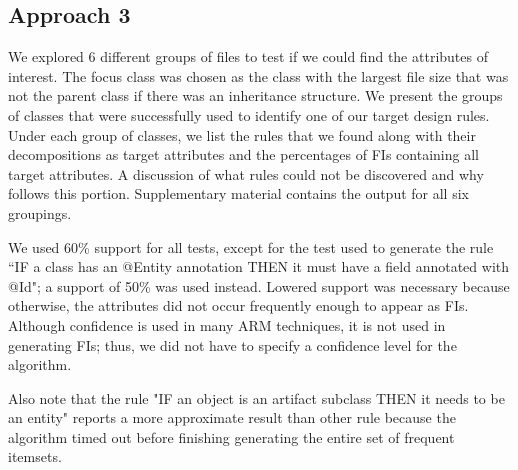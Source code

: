 \documentclass[12pt]{article}
\begin{document}
	\subsection{Approach 3}
	
	We explored 6 different groups of files to test if we could find the attributes of interest. The focus class was chosen as the class with the largest file size that was not the parent class if there was an inheritance structure. We present the groups of classes that were successfully used to identify one of our target design rules. Under each group of classes, we list the rules that we found along with their decompositions as target attributes and the percentages of FIs containing all target attributes. A discussion of what rules could not be discovered and why follows this portion. Supplementary material contains the output for all six groupings. 
	
	
	We used 60\% support for all tests, except for the test used to generate the rule ``IF a class has an @Entity annotation THEN it must have a field annotated with @Id"; a support of 50\% was used instead. Lowered support was necessary because otherwise, the attributes did not occur frequently enough to appear as FIs. Although confidence is used in many ARM techniques, it is not used in generating FIs; thus, we did not have to specify a confidence level for the algorithm. 
	
	Also note that the rule "IF an object is an artifact subclass THEN it needs to be an entity" reports a more approximate result than other rule because the algorithm timed out before finishing generating the entire set of frequent itemsets.
	
	
\newcommand{\textcoloryellow}{\cellcolor{yellow}}  %
\end{document}
